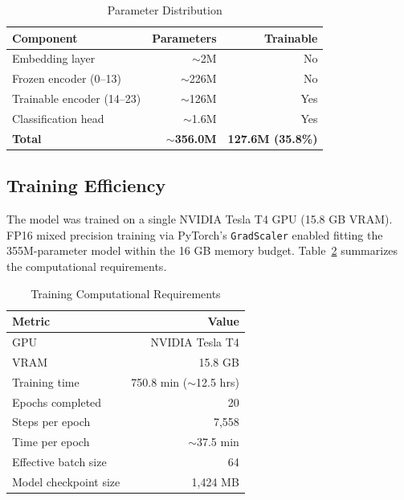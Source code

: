 \documentclass[conference, 10pt]{IEEEtran}
\begin{document}
\begin{table}[t]
    \centering
    \caption{Parameter Distribution}
    \label{tab:params}
    \begin{tabular}{lrr}
        \toprule
        \textbf{Component} & \textbf{Parameters} & \textbf{Trainable} \\
        \midrule
        Embedding layer            & $\sim$2M    & No \\
        Frozen encoder (0--13)     & $\sim$226M  & No \\
        Trainable encoder (14--23) & $\sim$126M  & Yes \\
        Classification head        & $\sim$1.6M  & Yes \\
        \midrule
        \textbf{Total}             & $\sim$\textbf{356.0M} & \textbf{127.6M (35.8\%)} \\
        \bottomrule
    \end{tabular}
\end{table}

\subsection{Training Efficiency}

The model was trained on a single NVIDIA Tesla T4 GPU (15.8 GB VRAM). FP16 mixed precision training via PyTorch's \texttt{GradScaler} enabled fitting the 355M-parameter model within the 16 GB memory budget. Table~\ref{tab:efficiency} summarizes the computational requirements.

\begin{table}[t]
    \centering
    \caption{Training Computational Requirements}
    \label{tab:efficiency}
    \begin{tabular}{lr}
        \toprule
        \textbf{Metric} & \textbf{Value} \\
        \midrule
        GPU                    & NVIDIA Tesla T4 \\
        VRAM                   & 15.8 GB \\
        Training time          & 750.8 min ($\sim$12.5 hrs) \\
        Epochs completed       & 20 \\
        Steps per epoch        & 7,558 \\
        Time per epoch         & $\sim$37.5 min \\
        Effective batch size   & 64 \\
        Model checkpoint size  & 1,424 MB \\
        \bottomrule
    \end{tabular}
\end{table}
\end{document}
